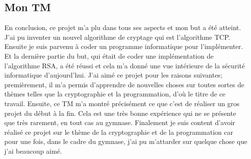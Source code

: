 \documentclass[a4paper,12pt]{report}
\begin{document}
     \subsection{Mon TM}
     En conclusion, ce projet m'a plu dans tous ses aspects et mon but a été atteint. J'ai pu inventer un nouvel algorithme de cryptage qui est l'algorithme TCP. Ensuite je suis parvenu à coder un programme informatique pour l'implémenter. Et la dernière partie du but, qui était de coder une implémen\-tation de l'algorithme RSA, a été réussi et cela m'a donné une vue intérieure de la sécurité informatique d'aujourd'hui. \newline
     J'ai aimé ce projet pour les raisons suivantes; premièrement, il m'a permis d'apprendre de nouvelles choses sur toutes sortes de thèmes telles que la cryptographie et la programmation, d'où le titre de ce travail. Ensuite, ce TM m'a montré précisément ce que c'est de réaliser un gros projet du début à la fin. Cela est une très bonne expérience qui ne se présente que très rarement, en tout cas au gymnase. Finalement je suis content d'avoir réalisé ce projet sur le thème de la cryptographie et de la programmation car pour une fois, dans le cadre du gymnase, j'ai pu m'attarder sur quelque chose que j'ai beaucoup aimé.
     
\pagebreak     
     
\end{document}
